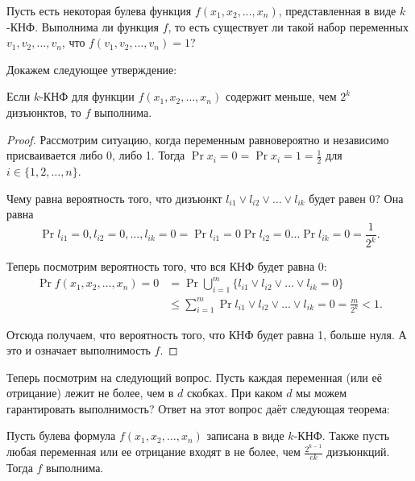\begin{problem}
    Пусть есть некоторая булева функция \(f(x_1, x_2, \dots, x_n)\), представленная в виде
    \(k\)-КНФ. Выполнима ли функция \(f\), то есть существует ли такой набор переменных \(v_1, v_2, \dots, v_n\), что \(f(v_1, v_2, \dots, v_n) = 1\)?
\end{problem}

Докажем следующее утверждение:
\begin{theorem}
    Если \(k\)-КНФ для функции \(f(x_1, x_2, \dots, x_n)\) содержит меньше, чем \(2^k\) дизъюнктов, то \(f\) выполнима.
\end{theorem}
\begin{proof}
    Рассмотрим ситуацию, когда переменным равновероятно и независимо присваивается либо 0, либо 1. Тогда \(\Pr{x_i = 0} = \Pr{x_i = 1} = \frac{1}{2}\) для \(i \in \{1, 2, \dots, n\}\). 
    
    Чему равна вероятность того, что дизъюнкт \(l_{i1} \lor l_{i2} \lor \dots \lor l_{ik}\) будет равен 0? Она равна
    \[\Pr{l_{i1} = 0, l_{i2} = 0, \dots, l_{ik} = 0} = \Pr{l_{i1} = 0}\Pr{l_{i2} = 0} \dotsc\Pr{l_{ik} = 0} = \frac{1}{2^k}.\]
    
    Теперь посмотрим вероятность того, что вся КНФ будет равна 0:
    \[\begin{aligned}
    \Pr{f(x_1, x_2, \dots, x_n) = 0} &= \Pr{\bigcup_{i = 1}^{m} \{l_{i1} \lor l_{i2} \lor \dots \lor l_{ik} = 0\}} \\
    &\leq \sum_{i = 1}^{m}\Pr{l_{i1} \lor l_{i2} \lor \dots \lor l_{ik} = 0} = \frac{m}{2^k} < 1.
    \end{aligned}\]
    
    Отсюда получаем, что вероятность того, что КНФ будет равна 1, больше нуля. А это и означает выполнимость \(f\).
\end{proof}

Теперь посмотрим на следующий вопрос. Пусть каждая переменная (или её отрицание) лежит не более, чем в \(d\) скобках. При каком \(d\) мы можем гарантировать выполнимость? Ответ на этот вопрос даёт следующая теорема:

\begin{theorem}
    Пусть булева формула \(f(x_1, x_2, \dots, x_n)\) записана в виде \(k\)-КНФ. Также пусть любая переменная или ее отрицание входят в не более, чем \(\frac{2^{k-1}}{ek}\) дизъюнкций. Тогда \(f\) выполнима.
\end{theorem}

